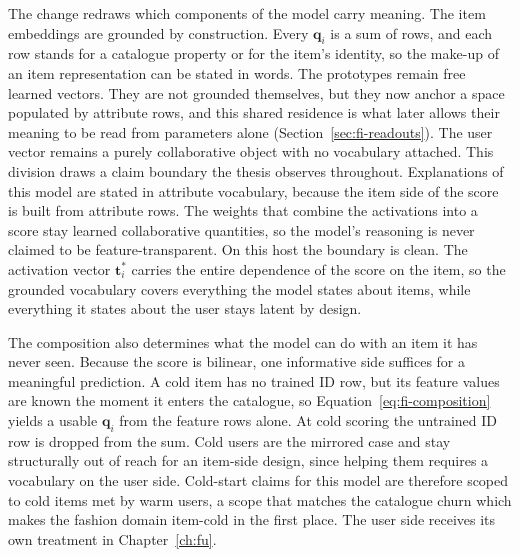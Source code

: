 The change redraws which components of the model carry meaning. The item
embeddings are grounded by construction. Every $\mathbf{q}_i$ is a sum
of rows, and each row stands for a catalogue property or for the item's
identity, so the make-up of an item representation can be stated in
words. The prototypes remain free learned vectors. They are not grounded
themselves, but they now anchor a space populated by attribute rows, and
this shared residence is what later allows their meaning to be read from
parameters alone (Section~\ref{sec:fi-readouts}). The user vector
remains a purely collaborative object with no vocabulary attached. This
division draws a claim boundary the thesis observes throughout.
Explanations of this model are stated in attribute vocabulary, because
the item side of the score is built from attribute rows. The weights
that combine the activations into a score stay learned collaborative
quantities, so the model's reasoning is never claimed to be
feature-transparent. On this host the boundary is clean. The activation
vector $\mathbf{t}^*_i$ carries the entire dependence of the score on
the item, so the grounded vocabulary covers everything the model states
about items, while everything it states about the user stays latent by
design.

The composition also determines what the model can do with an item it
has never seen. Because the score is bilinear, one informative side
suffices for a meaningful prediction. A cold item has no trained ID row,
but its feature values are known the moment it enters the catalogue, so
Equation~\ref{eq:fi-composition} yields a usable $\mathbf{q}_i$ from the
feature rows alone. At cold scoring the untrained ID row is dropped from
the sum. Cold users are the mirrored case and stay structurally out of
reach for an item-side design, since helping them requires a vocabulary
on the user side. Cold-start claims for this model are therefore scoped
to cold items met by warm users, a scope that matches the catalogue
churn which makes the fashion domain item-cold in the first place. The
user side receives its own treatment in Chapter~\ref{ch:fu}.
